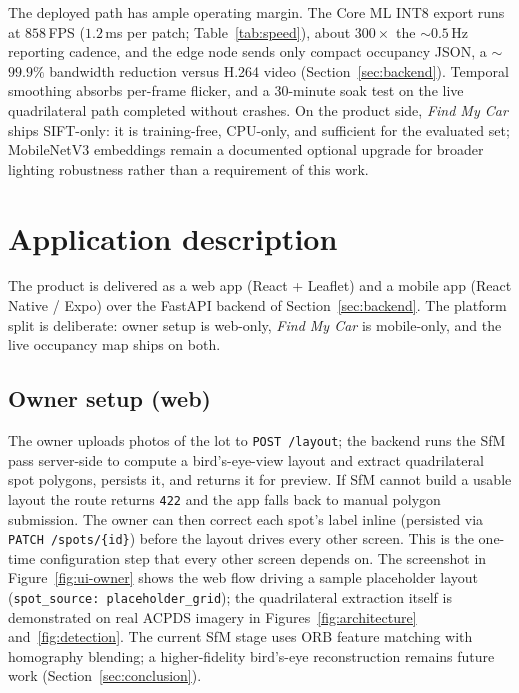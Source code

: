 \documentclass[10pt,twocolumn,letterpaper]{article}
\begin{document}
The deployed path has ample operating margin. The Core ML INT8 export runs
at $858$\,FPS ($1.2$\,ms per patch; Table~\ref{tab:speed}), about
$300\times$ the $\sim$$0.5$\,Hz reporting cadence, and the edge node sends
only compact occupancy JSON, a $\sim$$99.9\%$ bandwidth reduction versus
H.264 video (Section~\ref{sec:backend}). Temporal smoothing absorbs
per-frame flicker, and a 30-minute soak test on the live quadrilateral path
completed without crashes. On the product side, \emph{Find My Car} ships
SIFT-only: it is training-free, CPU-only, and sufficient for the evaluated
set; MobileNetV3 embeddings remain a documented optional upgrade for
broader lighting robustness rather than a requirement of this work.

\section{Application description}
\label{sec:product}

The product is delivered as a web app (React + Leaflet) and a mobile app
(React Native / Expo) over the FastAPI backend of
Section~\ref{sec:backend}. The platform split is deliberate: owner setup is
web-only, \emph{Find My Car} is mobile-only, and the live occupancy map
ships on both.

\subsection{Owner setup (web)}

The owner uploads photos of the lot to \texttt{POST /layout}; the backend
runs the SfM pass server-side to compute a bird's-eye-view layout and
extract quadrilateral spot polygons, persists it, and returns it for
preview. If SfM cannot build a usable layout the route returns
\texttt{422} and the app falls back to manual polygon submission. The owner
can then correct each spot's label inline (persisted via
\texttt{PATCH /spots/\{id\}}) before the layout drives every other screen.
This is the one-time configuration step that every other screen depends on.
The screenshot in Figure~\ref{fig:ui-owner} shows the web flow driving a
sample placeholder layout (\texttt{spot\_source: placeholder\_grid}); the
quadrilateral extraction itself is demonstrated on real ACPDS imagery in
Figures~\ref{fig:architecture} and~\ref{fig:detection}. The current SfM
stage uses ORB feature matching with homography blending; a
higher-fidelity bird's-eye reconstruction remains future work
(Section~\ref{sec:conclusion}).
\end{document}

